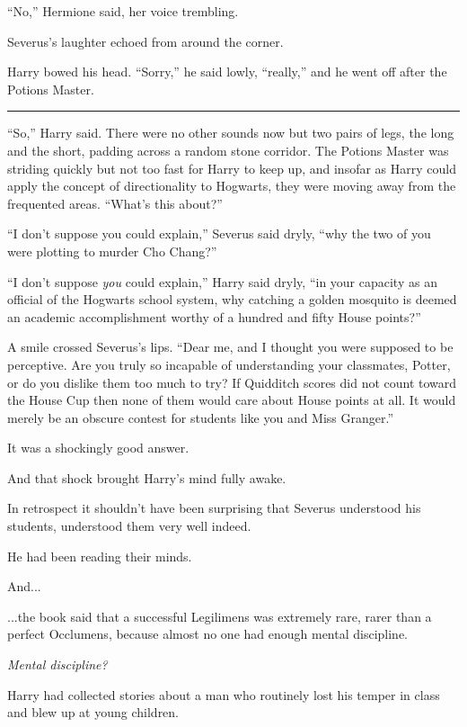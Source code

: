 ``No,'' Hermione said, her voice trembling.

Severus's laughter echoed from around the corner.

Harry bowed his head. ``Sorry,'' he said lowly, ``really,'' and he went
off after the Potions Master.

\begin{center}\rule{3in}{0.4pt}\end{center}

``So,'' Harry said. There were no other sounds now but two pairs of
legs, the long and the short, padding across a random stone corridor.
The Potions Master was striding quickly but not too fast for Harry to
keep up, and insofar as Harry could apply the concept of directionality
to Hogwarts, they were moving away from the frequented areas. ``What's
this about?''

``I don't suppose you could explain,'' Severus said dryly, ``why the two
of you were plotting to murder Cho Chang?''

``I don't suppose \emph{you} could explain,'' Harry said dryly, ``in your
capacity as an official of the Hogwarts school system, why catching a
golden mosquito is deemed an academic accomplishment worthy of a hundred
and fifty House points?''

A smile crossed Severus's lips. ``Dear me, and I thought you were
supposed to be perceptive. Are you truly so incapable of understanding
your classmates, Potter, or do you dislike them too much to try? If
Quidditch scores did not count toward the House Cup then none of them
would care about House points at all. It would merely be an obscure
contest for students like you and Miss Granger.''

It was a shockingly good answer.

And that shock brought Harry's mind fully awake.

In retrospect it shouldn't have been surprising that Severus understood
his students, understood them very well indeed.

He had been reading their minds.

And...

...the book said that a successful Legilimens was extremely rare,
rarer than a perfect Occlumens, because almost no one had enough mental
discipline.

\emph{Mental discipline?}

Harry had collected stories about a man who routinely lost his temper in
class and blew up at young children.

